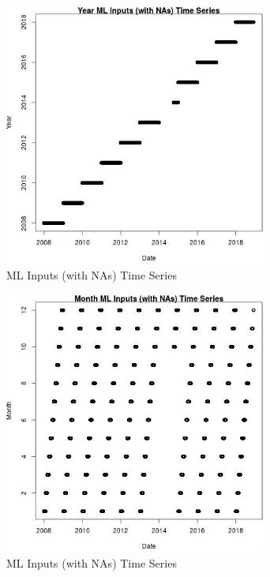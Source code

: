 \begin{figure} 
\centering  
\includegraphics[width=0.77\textwidth]{Code_Outputs/Report_ML_input_PM25_Step4_part_e_de_duplicated_aveswNAs_YearvDate.jpg} 
\caption{\label{fig:Report_ML_input_PM25_Step4_part_e_de_duplicated_aveswNAsYearvDate}ML Inputs (with NAs) Time Series} 
\end{figure} 
 

\clearpage 

\begin{figure} 
\centering  
\includegraphics[width=0.77\textwidth]{Code_Outputs/Report_ML_input_PM25_Step4_part_e_de_duplicated_aveswNAs_MonthvDate.jpg} 
\caption{\label{fig:Report_ML_input_PM25_Step4_part_e_de_duplicated_aveswNAsMonthvDate}ML Inputs (with NAs) Time Series} 
\end{figure} 
 


